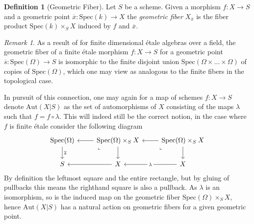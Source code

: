 \documentclass{article}
\theoremstyle{definition}
\newtheorem{definition}[theorem]{Definition}
\theoremstyle{remark}
\newtheorem*{remark}{Remark}
\theoremstyle{plain}
\begin{document}
\begin{definition}[Geometric Fiber]
	Let $S$ be a scheme. 
	Given a morphism $f: X \to S$ and a geometric point $\overline{x}: \text{Spec}(k) \to X$ the \textit{geometric fiber} $X_{\overline{x}}$ is the fiber product $\text{Spec}(k) \times_S X$ induced by $f$ and $\overline{x}$.
\end{definition}

\begin{remark}
As a result of  for finite dimensional \'etale algebras over a field, the geometric fiber of a finite \'etale morphism $f: X \to S$ for a geometric point $\overline{s} : \text{Spec}(\Omega) \to S $ is isomorphic to the finite disjoint union $\text{Spec}(\Omega \times \dots \times \Omega)$ of copies of $\text{Spec}(\Omega)$, which one may view as analogous to the finite fibers in the topological case.
\end{remark}

In pursuit of this connection, one may again for a map of schemes $f: X \to S$ denote $\text{Aut}(X|S)$ as the set of automorphisms of $X$ consisting of the maps $\lambda$ such that $f  = f \circ \lambda$.
This will indeed still be the correct notion, in the case where $f$ is finite \'etale consider the following diagram
\[\begin{tikzcd}
	{\text{Spec}(\Omega)} & {\text{Spec}(\Omega)\times_S X} & {\text{Spec}(\Omega)\times_S X} \\
	S & X & X
	\arrow["{\overline{s}}", from=1-1, to=2-1]
	\arrow[from=1-2, to=1-1]
	\arrow["\lrcorner"{anchor=center, pos=0.125, rotate=-90}, draw=none, from=1-2, to=2-1]
	\arrow[from=1-2, to=2-2]
	\arrow[from=1-3, to=1-2]
	\arrow["\lrcorner"{anchor=center, pos=0.125, rotate=-90}, draw=none, from=1-3, to=2-2]
	\arrow[from=1-3, to=2-3]
	\arrow[from=2-2, to=2-1]
	\arrow["\lambda"{description}, from=2-3, to=2-2]
\end{tikzcd}\]
By definition the leftmost square and the entire rectangle, but by gluing of pullbacks this means the righthand square is also a pullback.
As $\lambda$ is an isomorphism, so is the induced map on the geometric fiber $\text{Spec}(\Omega)\times_S X$, hence $\text{Aut}(X|S)$ has a natural action on geometric fibers for a given geometric point.
\end{document}
